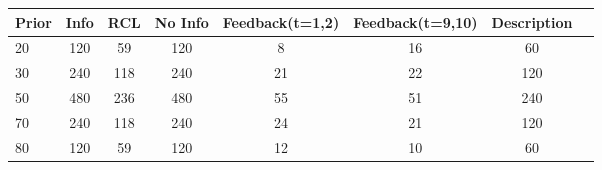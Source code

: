 {
	\def\sym#1{\ifmmode^{#1}\else\(^{#1}\)\fi}
	\begin{tabular}{l*{1}{ccccccc}}
		\toprule
		Prior & Info & RCL & No Info  & Feedback(t=1,2) & Feedback(t=9,10) & Description   \\
		\midrule
		20         &      120 &         59 &      120   &      8  &   16  &  60 \\
		\midrule
		30         &      240 &        118 &      240   &      21  &   22 &  120 \\
		\midrule
		50         &      480 &        236 &      480   &      55  &   51 &  240 \\
		\midrule
		70         &      240 &        118 &      240   &      24  &   21 &  120 \\
		\midrule
		80         &      120 &         59 &      120   &      12  &   10 &  60 \\
		\bottomrule
	\end{tabular}
}